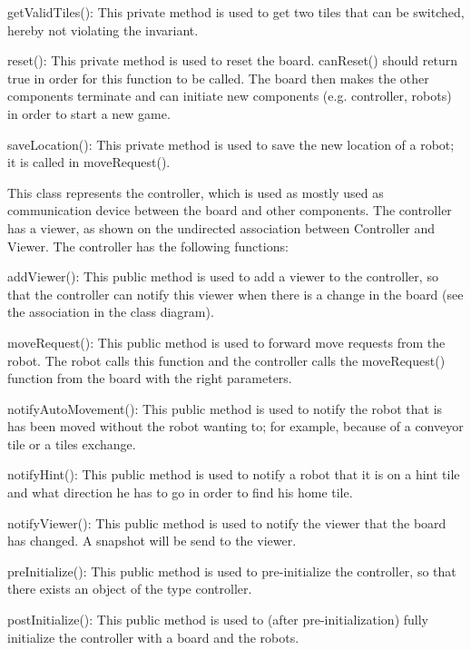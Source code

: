 \begin{description}
\begin{description}
            \item getValidTiles(): This private method is used to get two tiles that can be switched, hereby not violating the invariant.
            \item reset(): This private method is used to reset the board. canReset() should return true in order for this function to be called. The board then makes the other components terminate and can initiate new components (e.g. controller, robots) in order to start a new game.
            \item saveLocation(): This private method is used to save the new location of a robot; it is called in moveRequest().
        \end{description}
		\item[Controller] This class represents the controller, which is used as mostly used as communication device between the board and other components. The controller has a viewer, as shown on the undirected association between Controller and Viewer. The controller has the following functions:
        \begin{description}
            \item addViewer(): This public method is used to add a viewer to the controller, so that the controller can notify this viewer when there is a change in the board (see the association in the class diagram).
            \item moveRequest(): This public method is used to forward move requests from the robot. The robot calls this function and the controller calls the moveRequest() function from the board with the right parameters.
            \item notifyAutoMovement(): This public method is used to notify the robot that is has been moved without the robot wanting to; for example, because of a conveyor tile or a tiles exchange.
            \item notifyHint(): This public method is used to notify a robot that it is on a hint tile and what direction he has to go in order to find his home tile.
            \item notifyViewer(): This public method is used to notify the viewer that the board has changed. A snapshot will be send to the viewer.
            \item preInitialize(): This public method is used to pre-initialize the controller, so that there exists an object of the type controller.
            \item postInitialize(): This public method is used to (after pre-initialization) fully initialize the controller with a board and the robots.

\end{description}
\end{description}
